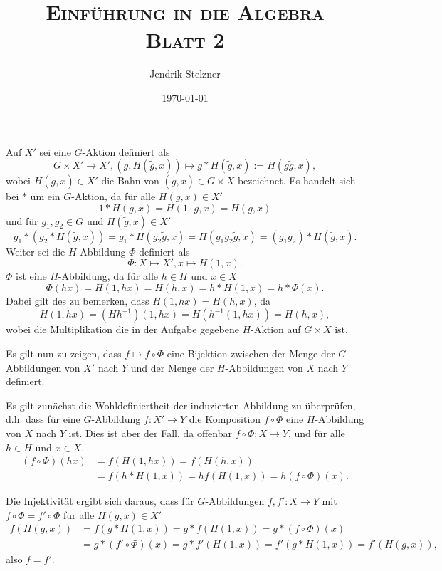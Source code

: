 \documentclass[a4paper,10pt]{article}
\title{\textsc{Einführung in die Algebra \\ \Large Blatt 2}}
\author{Jendrik Stelzner}
\date{\today}
\theoremstyle{definition}
\begin{document}
\maketitle





\section{}
Auf $X'$ sei eine $G$-Aktion definiert als
\[
 G \times X' \rightarrow X', (g,H(\tilde{g},x)) \mapsto g * H(\tilde{g},x) := H(g \tilde{g}, x),
\]
wobei $H(\tilde{g},x) \in X'$ die Bahn von $(\tilde{g},x) \in G \times X$ bezeichnet. Es handelt sich bei $*$ um ein $G$-Aktion, da für alle $H(g,x) \in X'$
\[
 1 * H(g,x) = H(1 \cdot g, x) = H(g,x)
\]
und für $g_1, g_2 \in G$ und $H(\tilde{g},x) \in X'$
\[
 g_1 * (g_2 * H(\tilde{g},x))
 = g_1 * H(g_2 \tilde{g}, x)
 = H(g_1 g_2 \tilde{g}, x)
 = (g_1 g_2) * H(\tilde{g},x).
\]
Weiter sei die $H$-Abbildung $\Phi$ definiert als
\[
 \Phi : X \mapsto X', x \mapsto H(1,x).
\]
$\Phi$ ist eine $H$-Abbildung, da für alle $h \in H$ und $x \in X$
\[
 \Phi(hx) = H(1,hx) = H(h,x) = h * H(1,x) = h * \Phi(x).
\]
Dabei gilt des zu bemerken, dass $H(1,hx) = H(h,x)$, da
\[
 H(1,hx) = (H h^{-1}) (1,hx) = H (h^{-1}(1,hx)) = H(h,x),
\]
wobei die Multiplikation die in der Aufgabe gegebene $H$-Aktion auf $G \times X$ ist.

Es gilt nun zu zeigen, dass $f \mapsto f \circ \Phi$ eine Bijektion zwischen der Menge der $G$-Abbildungen von $X'$ nach $Y$ und der Menge der $H$-Abbildungen von $X$ nach $Y$ definiert.

Es gilt zunächst die Wohldefiniertheit der induzierten Abbildung zu überprüfen, d.h. dass für eine $G$-Abbildung $f : X' \rightarrow Y$ die Komposition $f \circ \Phi$ eine $H$-Abbildung von $X$ nach $Y$ ist. Dies ist aber der Fall, da offenbar $f \circ \Phi : X \rightarrow Y$, und für alle $h \in H$ und $x \in X$.
\begin{align*}
 (f \circ \Phi)(hx)
 &= f( H(1,hx) )
 = f( H(h,x) ) \\
 &= f(h * H(1,x) )
 = h f( H(1,x) )
 = h (f \circ \Phi)(x).
\end{align*}

Die Injektivität ergibt sich daraus, dass für $G$-Abbildungen $f, f' : X \rightarrow Y$ mit $f \circ \Phi = f' \circ \Phi$ für alle $H(g,x) \in X'$
\begin{align*}
 f( H(g,x) )
 &= f( g * H(1,x) )
 = g * f( H(1,x) )
 = g * (f \circ \Phi)(x) \\
 &= g * (f' \circ \Phi)(x)
 = g * f'( H(1,x) )
 = f'( g * H(1,x) )
 = f'( H(g,x) ),
\end{align*}
also $f = f'$.
\end{document}
